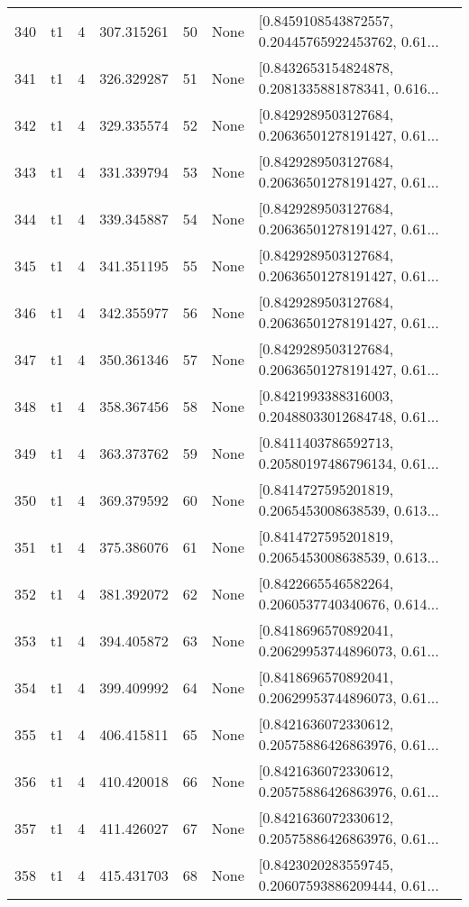\begin{tabular}{lllrlll}
340 &  t1 &   4 &  307.315261 &   50 &  None &  [0.8459108543872557, 0.20445765922453762, 0.61... \\
341 &  t1 &   4 &  326.329287 &   51 &  None &  [0.8432653154824878, 0.2081335881878341, 0.616... \\
342 &  t1 &   4 &  329.335574 &   52 &  None &  [0.8429289503127684, 0.20636501278191427, 0.61... \\
343 &  t1 &   4 &  331.339794 &   53 &  None &  [0.8429289503127684, 0.20636501278191427, 0.61... \\
344 &  t1 &   4 &  339.345887 &   54 &  None &  [0.8429289503127684, 0.20636501278191427, 0.61... \\
345 &  t1 &   4 &  341.351195 &   55 &  None &  [0.8429289503127684, 0.20636501278191427, 0.61... \\
346 &  t1 &   4 &  342.355977 &   56 &  None &  [0.8429289503127684, 0.20636501278191427, 0.61... \\
347 &  t1 &   4 &  350.361346 &   57 &  None &  [0.8429289503127684, 0.20636501278191427, 0.61... \\
348 &  t1 &   4 &  358.367456 &   58 &  None &  [0.8421993388316003, 0.20488033012684748, 0.61... \\
349 &  t1 &   4 &  363.373762 &   59 &  None &  [0.8411403786592713, 0.20580197486796134, 0.61... \\
350 &  t1 &   4 &  369.379592 &   60 &  None &  [0.8414727595201819, 0.2065453008638539, 0.613... \\
351 &  t1 &   4 &  375.386076 &   61 &  None &  [0.8414727595201819, 0.2065453008638539, 0.613... \\
352 &  t1 &   4 &  381.392072 &   62 &  None &  [0.8422665546582264, 0.2060537740340676, 0.614... \\
353 &  t1 &   4 &  394.405872 &   63 &  None &  [0.8418696570892041, 0.20629953744896073, 0.61... \\
354 &  t1 &   4 &  399.409992 &   64 &  None &  [0.8418696570892041, 0.20629953744896073, 0.61... \\
355 &  t1 &   4 &  406.415811 &   65 &  None &  [0.8421636072330612, 0.20575886426863976, 0.61... \\
356 &  t1 &   4 &  410.420018 &   66 &  None &  [0.8421636072330612, 0.20575886426863976, 0.61... \\
357 &  t1 &   4 &  411.426027 &   67 &  None &  [0.8421636072330612, 0.20575886426863976, 0.61... \\
358 &  t1 &   4 &  415.431703 &   68 &  None &  [0.8423020283559745, 0.20607593886209444, 0.61... \\

\end{tabular}
